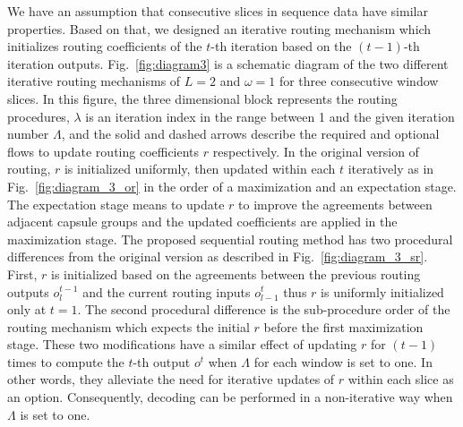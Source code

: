 \documentclass[review]{elsarticle}
\begin{document}
We have an assumption that consecutive slices in sequence data have similar properties.
Based on that, we designed an iterative routing mechanism which initializes routing coefficients of the $t$-th iteration based on the $(t-1)$-th iteration outputs.
Fig.~\ref{fig:diagram3} is a schematic diagram of the two different iterative routing mechanisms of $L=2$ and $\omega=1$ for three consecutive window slices.
In this figure, the three dimensional block represents the routing procedures, $\lambda$ is an iteration index in the range between 1 and the given iteration number $\Lambda$, and the solid and dashed arrows describe the required and optional flows to update routing coefficients $r$ respectively.
In the original version of routing, $r$ is initialized uniformly, then updated within each $t$ iteratively as in Fig.~\ref{fig:diagram_3_or} in the order of a maximization and an expectation stage.
The expectation stage means to update $r$ to improve the agreements between adjacent capsule groups and the updated coefficients are applied in the maximization stage.
The proposed sequential routing method has two procedural differences from the original version as described in Fig.~\ref{fig:diagram_3_sr}.
First, $r$ is initialized based on the agreements between the previous routing outputs $o_{l}^{t-1}$ and the current routing inputs $o_{l-1}^{t}$ thus $r$ is uniformly initialized only at $t=1$.
The second procedural difference is the sub-procedure order of the routing mechanism which expects the initial $r$ before the first maximization stage.
These two modifications have a similar effect of updating $r$ for $(t-1)$ times to compute the $t$-th output $o^t$ when $\Lambda$ for each window is set to one.
In other words, they alleviate the need for iterative updates of $r$ within each slice as an option.
Consequently, decoding can be performed in a non-iterative way when $\Lambda$ is set to one.
\end{document}
